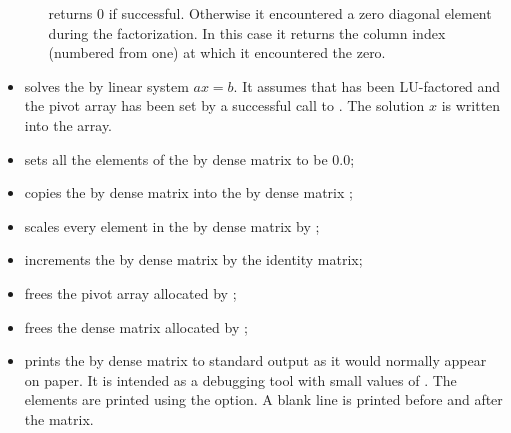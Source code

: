 \begin{itemize}
\begin{enumerate}
     returns 0 if successful. Otherwise it encountered a zero  
    diagonal element during the factorization. In this case it     
    returns the column index (numbered from one) at which it       
    encountered the zero.
    \end{enumerate}

\item {}
  \par {} solves the  by  linear system $ax = b$. 
  It assumes that  has been LU-factored and the pivot array  has  
  been set by a successful call to . The solution $x$   
  is written into the  array.

\item {}
  \par {} sets all the elements of the  by  dense matrix
   to be $0.0$;

\item {}
  \par {} copies the  by  dense matrix  into the
   by  dense matrix ;

\item {}
  \par {} scales every element in the  by  dense
  matrix  by ;

\item {}
  \par {} increments the  by  dense matrix  by the
  identity matrix;

\item {}
  \par {} frees the pivot array  allocated by ;

\item {}
  \par {} frees the dense matrix  allocated by ;

\item {}
  \par {} prints the  by  dense matrix  to standard     
  output as it would normally appear on paper. It is intended as 
  a debugging tool with small values of . The elements are      
  printed using the  option. A blank line is printed before    
  and after the matrix. 

\end{itemize}
